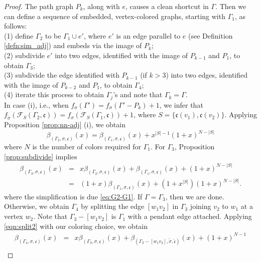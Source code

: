 \documentclass[10pt, reqno]{amsart}
\newcommand{\hf}{\hspace*{0.5cm}}
\theoremstyle{plain}
\theoremstyle{remark}
\theoremstyle{definition}
\numberwithin{equation}{section}
\begin{document}
\begin{proof}
The path graph $P_k$, along with $e$, causes a clean shortcut in $\Gamma$. Then we can define a sequence of embedded, vertex-colored graphs, starting with $\Gamma_1$, as follows:\\
\hf (1) define $\Gamma_2$ to be $\Gamma_1\cup e'$, where $e'$ is an edge parallel to $e$ (see Definition \ref{defn:sim_adj}) and embeds via the image of $P_k$;\\
\hf (2) subdivide $e'$ into two edges, identified with the image of $P_{k-1}$ and $P_1$, to obtain $\Gamma_3$;\\
\hf (3) subdivide the edge identified with $P_{k-1}$ (if $k>3$) into two edges, identified with the image of $P_{k-2}$ and $P_1$, to obtain $\Gamma_4$;\\
\hf (4) iterate this process to obtain $\Gamma_j$'s and note that $\Gamma_k=\Gamma$.\\
In case (i), i.e., when $f_{\sigma}(\Gamma')=f_{\sigma}(\Gamma'-P_k)+1$, we infer that 
$f_{\tilde{\sigma}}(\mathscr{F}_S(\Gamma_2,\mathfrak{c}))=f_{\sigma}(\mathscr{F}_S(\Gamma_1,\mathfrak{c}))+1$, where $S=\{\mathfrak{c}(v_1),\mathfrak{c}(v_2)\}$. Applying Proposition \ref{prop:nn-adj} (i), we obtain 
\begin{equation}\label{eq:G2-G1}
\beta_{(\Gamma_2,\sigma,\mathfrak{c})}(x)=\beta_{(\Gamma_1,\sigma,\mathfrak{c})}(x)+x^{|S|-1}(1+x)^{N-|S|}
\end{equation}
where $N$ is the number of colors required for $\Gamma_1$. For $\Gamma_3$, Proposition \ref{prop:subdivide} implies 
\begin{eqnarray}
\beta_{(\Gamma_3,\sigma,\mathfrak{c})}(x) & = & x\beta_{(\Gamma_2,\sigma,\mathfrak{c})}(x)+\beta_{(\Gamma_1,\sigma,\mathfrak{c})}(x)+(1+x)^{N-|S|}\nonumber \\
& = & (1+x)\beta_{(\Gamma_1,\sigma,\mathfrak{c})}(x)+(1+x^{|S|})(1+x)^{N-|S|}.\label{eqn:G3-G1}
\end{eqnarray}
where the simplification is due \eqref{eq:G2-G1}. If $\Gamma=\Gamma_3$, then we are done. Otherwise, we obtain $\Gamma_4$ by splitting the edge $[w_1v_2]$ in $\Gamma_3$ joining $v_2$ to $w_1$ at a vertex $w_2$. Note that $\Gamma_3-[w_1v_2]$ is $\Gamma_1$ with a pendant edge attached. Applying \eqref{eqn:split2} with our coloring choice, we obtain
\begin{eqnarray*}
\beta_{(\Gamma_4,\sigma,\mathfrak{c})}(x) & = & x\beta_{(\Gamma_3,\sigma,\mathfrak{c})}(x)+\beta_{(\Gamma_3-[w_1v_2],\tilde{\sigma},\hat{\mathfrak{c}})}(x)+(1+x)^{N-1}\\

\end{eqnarray*}
\end{proof}
\end{document}
